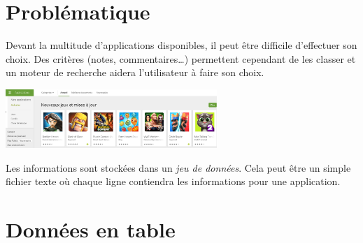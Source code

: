 \documentclass[a4paper,11pt]{article}
\begin{document}
\section{Problématique}
Devant la multitude d'applications disponibles, il peut être difficile d'effectuer son choix. Des critères (notes, commentaires\dots) permettent cependant de les classer et un moteur de recherche aidera l'utilisateur à faire son choix.
\begin{center}
    \centering
    \includegraphics[width=8cm]{ressources/playstore.png}
    \label{IMG}
\end{center}
Les informations sont stockées dans un \emph{jeu de données}. Cela peut être un simple fichier texte où chaque ligne contiendra les informations pour une application.
\begin{center}
\end{center}
\section{Données en table}
\end{document}
